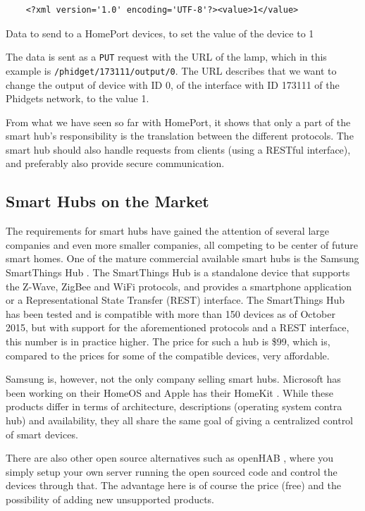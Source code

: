 \begin{listing}
  \begin{verbatim}
    <?xml version='1.0' encoding='UTF-8'?><value>1</value>
  \end{verbatim}
  \caption{Data to send to a HomePort devices, to set the value of the device to 1}
  \label{lst:homeportchange}
\end{listing}

The data is sent as a \texttt{PUT} request with the URL of the lamp, 
which in this example is \texttt{/phidget/173111/output/0}. 
The URL describes that we want to change the output of device with ID 0, 
of the interface with ID 173111 of the Phidgets network, to the value 1.

From what we have seen so far with HomePort, 
it shows that only a part of the smart hub's responsibility is the translation between the different protocols. 
The smart hub should also handle requests from clients (\eg using a RESTful interface), 
and preferably also provide secure communication. 

\subsection{Smart Hubs on the Market}\label{sec:smarthubsmarket}
The requirements for smart hubs have gained the attention of several large companies and even more smaller companies, 
all competing to be center of future smart homes. 
One of the mature commercial available smart hubs is the Samsung SmartThings Hub \cite{SMARTTHINGS}. 
The SmartThings Hub is a standalone device that supports the Z-Wave, ZigBee and WiFi protocols, 
and provides a smartphone application or a Representational State Transfer (REST) interface. 
The SmartThings Hub has been tested and is compatible with more than 150 devices as of October 2015,
but with support for the aforementioned protocols and a REST interface, this number is in practice higher.  
The price for such a hub is \$99, which is, compared to the prices for some of the compatible devices, very affordable. 

Samsung is, however, not the only company selling smart hubs. 
Microsoft has been working on their HomeOS \cite{HOMEOS} and Apple has their HomeKit \cite{HOMEKIT}.
While these products differ in terms of architecture, descriptions (operating system contra hub) and availability,
they all share the same goal of giving a centralized control of smart devices. 

There are also other open source alternatives such as openHAB \cite{OPENHAB}, 
where you simply setup your own server running the open sourced code and control the devices through that. 
The advantage here is of course the price (free) and the possibility of adding new unsupported products. 

